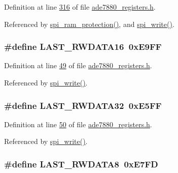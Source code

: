 Definition at line \hyperlink{a00036_source_l00316}{316} of file \hyperlink{a00036_source}{ade7880\-\_\-registers.\-h}.



Referenced by \hyperlink{a00040_source_l00343}{spi\-\_\-ram\-\_\-protection()}, and \hyperlink{a00040_source_l00221}{spi\-\_\-write()}.

\hypertarget{a00036_afcefca411effe86930341732382fb5e5}{
\subsubsection[{L\-A\-S\-T\-\_\-\-R\-W\-D\-A\-T\-A16}]{\setlength{\rightskip}{0pt plus 5cm}\#define L\-A\-S\-T\-\_\-\-R\-W\-D\-A\-T\-A16~0x\-E9\-F\-F}}\label{de/d8c/a00036_afcefca411effe86930341732382fb5e5}


Definition at line \hyperlink{a00036_source_l00049}{49} of file \hyperlink{a00036_source}{ade7880\-\_\-registers.\-h}.



Referenced by \hyperlink{a00040_source_l00221}{spi\-\_\-write()}.

\hypertarget{a00036_a0d09934e23666ce21357121f281f2f2a}{
\subsubsection[{L\-A\-S\-T\-\_\-\-R\-W\-D\-A\-T\-A32}]{\setlength{\rightskip}{0pt plus 5cm}\#define L\-A\-S\-T\-\_\-\-R\-W\-D\-A\-T\-A32~0x\-E5\-F\-F}}\label{de/d8c/a00036_a0d09934e23666ce21357121f281f2f2a}


Definition at line \hyperlink{a00036_source_l00050}{50} of file \hyperlink{a00036_source}{ade7880\-\_\-registers.\-h}.



Referenced by \hyperlink{a00040_source_l00221}{spi\-\_\-write()}.

\hypertarget{a00036_ac23cb2354e07d7403fca849805a8e278}{
\subsubsection[{L\-A\-S\-T\-\_\-\-R\-W\-D\-A\-T\-A8}]{\setlength{\rightskip}{0pt plus 5cm}\#define L\-A\-S\-T\-\_\-\-R\-W\-D\-A\-T\-A8~0x\-E7\-F\-D}}\label{de/d8c/a00036_ac23cb2354e07d7403fca849805a8e278}


